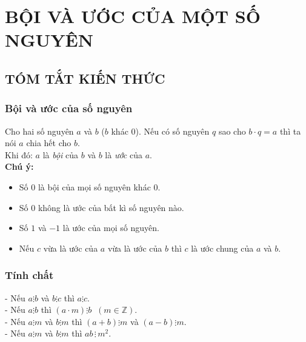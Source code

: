 \section{BỘI VÀ ƯỚC CỦA MỘT SỐ NGUYÊN}
\subsection{TÓM TẮT KIẾN THỨC}
\begin{tomtat}
	\subsubsection{Bội và ước của số nguyên}
Cho hai số nguyên $a$ và $b$ ($b$ khác $0$). Nếu có số nguyên $q$ sao cho $b \cdot q = a$ thì ta nói $a$ chia hết cho $b$.\\
Khi đó: $a$ là \textit{bội} của $b$ và $b$ là \textit{ước} của $a$.\\
\textbf{Chú ý:}
 \begin{itemize}
 \item Số $0$ là bội của mọi số nguyên khác $0$.
 \item Số $0$ không là ước của bất kì số nguyên nào.
 \item Số $1$ và $-1$ là ước của mọi số nguyên.
 \item Nếu $c$ vừa là ước của $a$ vừa là ước của $b$ thì $c$ là ước chung của $a$ và $b$.
 \end{itemize}
	\subsubsection{Tính chất}
- Nếu $a\vdots b$ và $b \vdots c$ thì $a \vdots c$.\\
- Nếu $a \vdots b$ thì $(a\cdot m) \vdots b \;\; (m \in \mathbb{Z})$.\\
- Nếu $a \vdots m$ và $b \vdots m$ thì $(a+b) \vdots m$ và $(a-b) \vdots m$.\\
- Nếu $a \vdots m$ và $b \vdots m$ thì $ab \,\vdots \,{m^2}$.
\end{tomtat}
